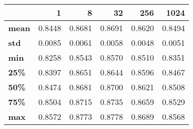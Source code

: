 \begin{tabular}{lrrrrr}
\toprule
{} &       1 &       8 &      32 &     256 &    1024 \\
\midrule
\textbf{mean} &  0.8448 &  0.8681 &  0.8691 &  0.8620 &  0.8494 \\
\textbf{std } &  0.0085 &  0.0061 &  0.0058 &  0.0048 &  0.0051 \\
\textbf{min } &  0.8258 &  0.8543 &  0.8570 &  0.8510 &  0.8351 \\
\textbf{25\% } &  0.8397 &  0.8651 &  0.8644 &  0.8596 &  0.8467 \\
\textbf{50\% } &  0.8474 &  0.8681 &  0.8700 &  0.8621 &  0.8508 \\
\textbf{75\% } &  0.8504 &  0.8715 &  0.8735 &  0.8659 &  0.8529 \\
\textbf{max } &  0.8572 &  0.8773 &  0.8778 &  0.8689 &  0.8568 \\
\bottomrule
\end{tabular}
